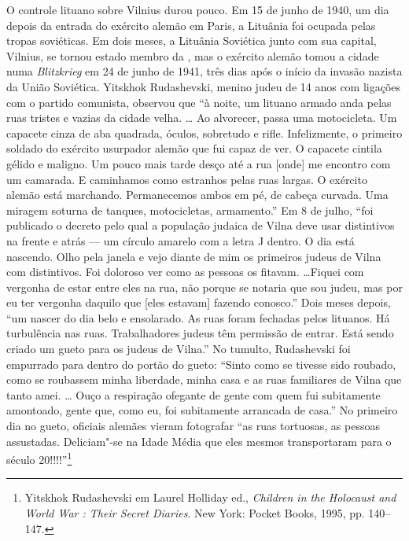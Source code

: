 O controle lituano sobre Vilnius durou pouco. Em 15 de junho de 1940, um
dia depois da entrada do exército alemão em Paris, a Lituânia foi
ocupada pelas tropas soviéticas. Em dois meses, a Lituânia Soviética
junto com sua capital, Vilnius, se tornou estado membro da , mas o
exército alemão tomou a cidade numa \emph{Blitzkrieg} em 24 de junho de
1941, três dias após o início da invasão nazista da União Soviética.
Yitskhok Rudashevski, menino judeu de 14 anos com ligações com o partido
comunista, observou que ``à noite, um lituano armado anda pelas ruas
tristes e vazias da cidade velha. \ldots{} Ao alvorecer, passa uma
motocicleta. Um capacete cinza de aba quadrada, óculos, sobretudo e
rifle. Infelizmente, o primeiro soldado do exército usurpador alemão que
fui capaz de ver. O capacete cintila gélido e maligno. Um pouco mais
tarde desço até a rua {[}onde{]} me encontro com um camarada. E
caminhamos como estranhos pelas ruas largas. O exército alemão está
marchando. Permanecemos ambos em pé, de cabeça curvada. Uma miragem
soturna de tanques, motocicletas, armamento.'' Em 8 de julho, ``foi
publicado o decreto pelo qual a população judaica de Vilna deve usar
distintivos na frente e atrás --- um círculo amarelo com a letra J dentro.
O dia está nascendo. Olho pela janela e vejo diante de mim os primeiros
judeus de Vilna com distintivos. Foi doloroso ver como as pessoas os
fitavam. \ldots{}Fiquei com vergonha de estar entre eles na rua, não
porque se notaria que sou judeu, mas por eu ter vergonha daquilo que
{[}eles estavam{]} fazendo conosco.'' Dois meses depois, ``um nascer do
dia belo e ensolarado. As ruas foram fechadas pelos lituanos. Há
turbulência nas ruas. Trabalhadores judeus têm permissão de entrar. Está
sendo criado um gueto para os judeus de Vilna.'' No tumulto, Rudashevski
foi empurrado para dentro do portão do gueto: ``Sinto como se tivesse
sido roubado, como se roubassem minha liberdade, minha casa e as ruas
familiares de Vilna que tanto amei. \ldots{} Ouço a respiração ofegante
de gente com quem fui subitamente amontoado, gente que, como eu, foi
subitamente arrancada de casa.'' No primeiro dia no gueto, oficiais
alemães vieram fotografar ``as ruas tortuosas, as pessoas assustadas.
Deliciam"-se na Idade Média que eles mesmos transportaram para o século
20!!!!''\footnote{Yitskhok Rudashevski em Laurel Holliday ed.,
  \emph{Children in the Holocaust and World War : Their Secret
  Diaries}. New York: Pocket Books, 1995, pp. 140--147.}

